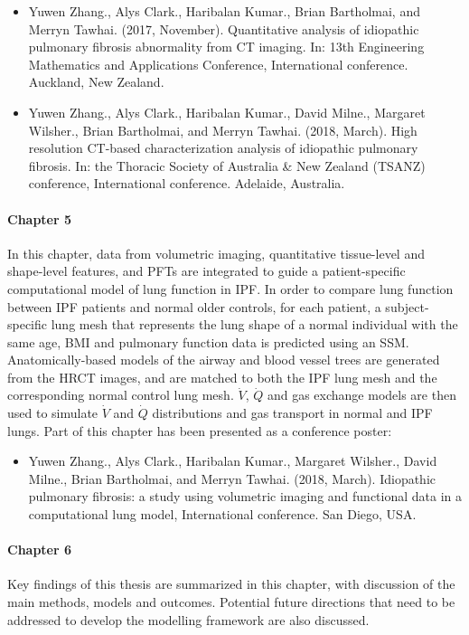 \begin{itemize}
  \item Yuwen Zhang., Alys Clark., Haribalan Kumar., Brian Bartholmai, and Merryn Tawhai. (2017, November). Quantitative analysis of idiopathic pulmonary fibrosis abnormality from CT imaging. In: 13th Engineering Mathematics and Applications Conference, International conference. Auckland, New Zealand.
	\item Yuwen Zhang., Alys Clark., Haribalan Kumar., David Milne., Margaret Wilsher., Brian Bartholmai, and Merryn Tawhai. (2018, March). High resolution CT-based characterization analysis of idiopathic pulmonary fibrosis. In: the Thoracic Society of Australia \& New Zealand (TSANZ) conference, International conference. Adelaide, Australia.
\end{itemize}

\paragraph{Chapter 5} In this chapter, data from volumetric imaging, quantitative tissue-level and shape-level features, and PFTs are integrated to guide a patient-specific computational model of lung function in IPF. In order to compare lung function between IPF patients and normal older controls, for each patient, a subject-specific lung mesh that represents the lung shape of a normal individual with the same age, BMI and pulmonary function data is predicted using an SSM. Anatomically-based models of the airway and blood vessel trees are generated from the HRCT images, and are matched to both the IPF lung mesh and the corresponding normal control lung mesh. $\dot{V}$, $\dot{Q}$ and gas exchange models are then used to simulate $\dot{V}$ and $\dot{Q}$ distributions and gas transport in normal and IPF lungs. Part of this chapter has been presented as a conference poster:

\begin{itemize}
  \item Yuwen Zhang., Alys Clark., Haribalan Kumar., Margaret Wilsher., David Milne., Brian Bartholmai, and Merryn Tawhai. (2018, March). Idiopathic pulmonary fibrosis: a study using volumetric imaging and functional data in a computational lung model, International conference. San Diego, USA.
\end{itemize}

\paragraph{Chapter 6} Key findings of this thesis are summarized in this chapter, with discussion of the main methods, models and outcomes. Potential future directions that need to be addressed to develop the modelling framework are also discussed. 
